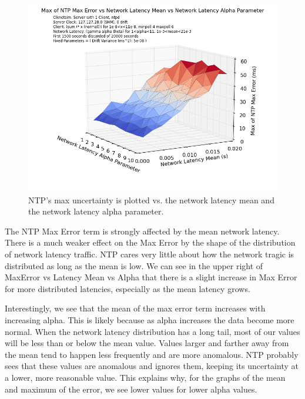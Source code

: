 

\begin{figure}[h]
  \caption{NTP's max uncertainty is plotted vs. the network latency mean and the network latency alpha parameter.}
  \label{fig:max-uncertainty_latency-mean_latency-alpha}
  \includegraphics[width=0.8\linewidth]{max_error-latency_mean-latency_alpha.png}
\end{figure}

The NTP Max Error term is strongly affected by the mean network
latency. There is a much weaker effect on the Max Error by the shape
of the distribution of network latency traffic. NTP cares very little
about how the network tragic is distributed as long as the mean is
low. We can see in the upper right of MaxError vs Latency Mean vs
Alpha that there is a slight increase in Max Error for more
distributed latencies, especially as the mean latency grows.

Interestingly, we see that the mean of the max error term increases
with increasing alpha. This is likely because as alpha increases the
data become more normal. When the network latency distribution has a
long tail, most of our values will be less than or below the mean
value. Values larger and farther away from the mean tend to happen
less frequently and are more anomalous. NTP probably sees that these
values are anomalous and ignores them, keeping its uncertainty at a
lower, more reasonable value. This explains why, for the graphs of the
mean and maximum of the error, we see lower values for lower alpha
values.

